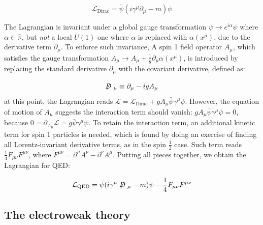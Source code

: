 \begin{equation}
    \mathcal{L}_\text{Dirac} = \bar{\psi} (i\gamma^\mu\partial_\mu - m) \psi
\end{equation}

The Lagrangian is invariant under a global gauge transformation
$\psi \rightarrow e^{i\alpha} \psi$ where $\alpha \in \mathbb{R}$,
but \emph{not} a local $U(1)$ one where $\alpha$ is replaced
with $\alpha(x^\mu)$,
due to the derivative term $\partial_\mu$.
To enforce such invariance,
A spin 1 field operator $A_\mu$,
which satisfies the gauge transformation
$A_\mu \rightarrow A_\mu + \frac{1}{g} \partial_\mu \alpha(x^\mu)$,
is introduced by replacing the standard derivative $\partial_\mu$ with the
covariant derivative, defined as:

\begin{equation}
    \fsl{D}_\mu \equiv \partial_\mu - i g A_\mu
\end{equation}
at this point, the Lagrangian reads
$\mathcal{L} = \mathcal{L}_\text{Dirac} + g A_\mu\bar{\psi}\gamma^\mu\psi$.
However,
the equation of motion of $A_\mu$
suggests the interaction term should vanish: $g A_\mu\bar{\psi}\gamma^\mu\psi = 0$,
because $0 = \partial_{A_\mu} \mathcal{L} = g \bar{\psi}\gamma^\mu\psi$.
To retain the interaction term,
an additional kinetic term for spin 1 particles is needed,
which is found by doing an exercise of finding all Lorentz-invariant
derivative terms, as in the spin $\frac{1}{2}$ case.
Such term reads $\frac{1}{4}F_{\mu\nu}F^{\mu\nu}$,
where $F^{\mu\nu} = \partial^\mu A^\nu - \partial^\nu A^\mu$.
Putting all pieces together, we obtain the Lagrangian for QED:

\begin{equation}
    \mathcal{L}_\text{QED} = \bar{\psi} (i\gamma^\mu\fsl{D}_\mu - m) \psi - \frac{1}{4}F_{\mu\nu}F^{\mu\nu}
\end{equation}


\subsection{The electroweak theory}
\label{ew-th}

